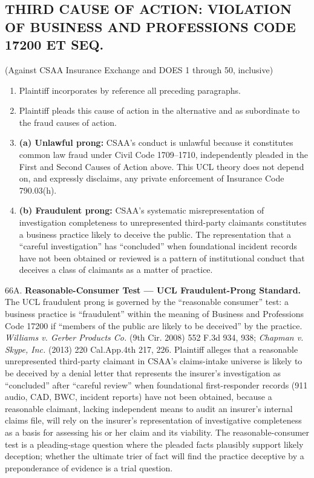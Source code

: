 \subsection{THIRD CAUSE OF ACTION: VIOLATION OF BUSINESS AND PROFESSIONS CODE \textsection{} 17200 ET SEQ.}\label{third-cause-of-action-violation-of-business-and-professions-code-17200-et-seq.}

(Against CSAA Insurance Exchange and DOES 1 through 50, inclusive)

\begin{enumerate}
\def\labelenumi{\arabic{enumi}.}
\setcounter{enumi}{62}
\item
  Plaintiff incorporates by reference all preceding paragraphs.
\item
  Plaintiff pleads this cause of action in the alternative and as subordinate to the fraud causes of action.
\item
  \textbf{(a) Unlawful prong:} CSAA's conduct is unlawful because it constitutes common law fraud under Civil Code \textsection{}\textsection{} 1709--1710, independently pleaded in the First and Second Causes of Action above. This UCL theory does not depend on, and expressly disclaims, any private enforcement of Insurance Code \textsection{} 790.03(h).
\item
  \textbf{(b) Fraudulent prong:} CSAA's systematic misrepresentation of investigation completeness to unrepresented third-party claimants constitutes a business practice likely to deceive the public. The representation that a ``careful investigation'' has ``concluded'' when foundational incident records have not been obtained or reviewed is a pattern of institutional conduct that deceives a class of claimants as a matter of practice.
\end{enumerate}

66A. \textbf{Reasonable-Consumer Test --- UCL Fraudulent-Prong Standard.} The UCL fraudulent prong is governed by the ``reasonable consumer'' test: a business practice is ``fraudulent'' within the meaning of Business and Professions Code \textsection{} 17200 if ``members of the public are likely to be deceived'' by the practice. \emph{Williams v. Gerber Products Co.} (9th Cir. 2008) 552 F.3d 934, 938; \emph{Chapman v. Skype, Inc.} (2013) 220 Cal.App.4th 217, 226. Plaintiff alleges that a reasonable unrepresented third-party claimant in CSAA's claims-intake universe is likely to be deceived by a denial letter that represents the insurer's investigation as ``concluded'' after ``careful review'' when foundational first-responder records (911 audio, CAD, BWC, incident reports) have not been obtained, because a reasonable claimant, lacking independent means to audit an insurer's internal claims file, will rely on the insurer's representation of investigative completeness as a basis for assessing his or her claim and its viability. The reasonable-consumer test is a pleading-stage question where the pleaded facts plausibly support likely deception; whether the ultimate trier of fact will find the practice deceptive by a preponderance of evidence is a trial question.

